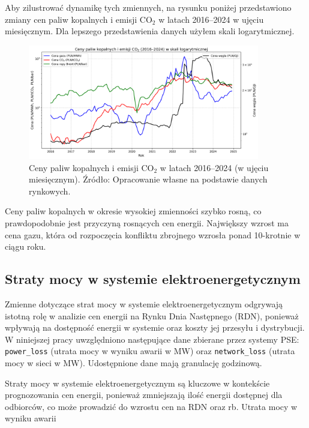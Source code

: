 Aby zilustrować dynamikę tych zmiennych, na rysunku poniżej przedstawiono zmiany cen paliw kopalnych i emisji CO$_2$ w latach 2016--2024 w ujęciu miesięcznym. Dla lepszego przedstawienia danych użyłem skali logarytmicznej.

\begin{figure}[h]
    \centering
    \includegraphics[width=0.9\textwidth]{../plots/fuels/fuel_prices_2016_2024.png}
    \caption{Ceny paliw kopalnych i emisji CO$_2$ w latach 2016--2024 (w ujęciu miesięcznym). Źródło: Opracowanie własne na podstawie danych rynkowych.}
    \label{fig:fuel_prices}
\end{figure}

Ceny paliw kopalnych w okresie wysokiej zmienności szybko rosną, co prawdopodobnie jest przyczyną rosnących cen energii. Największy wzrost ma cena gazu, która od rozpoczęcia konfliktu zbrojnego wzrosła ponad 10-krotnie w ciągu roku. 

\subsection{Straty mocy w systemie elektroenergetycznym}
\label{subsec:losses}

Zmienne dotyczące strat mocy w systemie elektroenergetycznym odgrywają istotną rolę w analizie cen energii na Rynku Dnia Następnego (RDN), ponieważ wpływają na dostępność energii w systemie oraz koszty jej przesyłu i dystrybucji. W niniejszej pracy uwzględniono następujące dane zbierane przez systemy PSE: \texttt{power\_loss} (utrata mocy w wyniku awarii w MW) oraz \texttt{network\_loss} (utrata mocy w sieci w MW). Udostępnione dane mają granulację godzinową. 

Straty mocy w systemie elektroenergetycznym są kluczowe w kontekście prognozowania cen energii, ponieważ zmniejszają ilość energii dostępnej dla odbiorców, co może prowadzić do wzrostu cen na RDN oraz \gls{rb}. Utrata mocy w wyniku awarii


